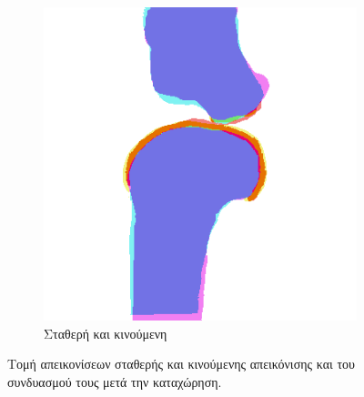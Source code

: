 \documentclass[a4paper,12pt]{article}
\begin{document}
\begin{figure}[H]
    \begin{subfigure}[t]{0.4\linewidth}
    \includegraphics[width=\linewidth]{combination_label_after_registration_1.png}
    \caption{Σταθερή και κινούμενη}
    \end{subfigure}

    \caption{Τομή απεικονίσεων σταθερής και κινούμενης απεικόνισης και του
             συνδυασμού τους μετά την καταχώρηση.}
    \label{fig:registration_after:1}
\end{figure}
\end{document}
